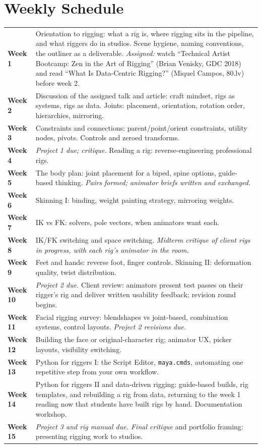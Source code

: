 \documentclass[10pt,a4paper]{article}
\begin{document}
\section{Weekly Schedule}
\begin{tabularx}{\textwidth}{@{}p{1.6cm}X@{}}
\textbf{Week 1} & Orientation to rigging: what a rig is, where rigging sits in the pipeline, and what riggers do in studios. Scene hygiene, naming conventions, the outliner as a deliverable. \textit{Assigned:} watch ``Technical Artist Bootcamp: Zen in the Art of Rigging'' (Brian Venisky, GDC 2018) and read ``What Is Data-Centric Rigging?'' (Miquel Campos, 80.lv) before week 2. \\
\textbf{Week 2} & Discussion of the assigned talk and article: craft mindset, rigs as systems, rigs as data. Joints: placement, orientation, rotation order, hierarchies, mirroring. \\
\textbf{Week 3} & Constraints and connections: parent/point/orient constraints, utility nodes, pivots. Controls and zeroed transforms. \\
\textbf{Week 4} & \textit{Project 1 due; critique.} Reading a rig: reverse-engineering professional rigs. \\
\textbf{Week 5} & The body plan: joint placement for a biped, spine options, guide-based thinking. \textit{Pairs formed; animator briefs written and exchanged.} \\
\textbf{Week 6} & Skinning I: binding, weight painting strategy, mirroring weights. \\
\textbf{Week 7} & IK vs FK: solvers, pole vectors, when animators want each. \\
\textbf{Week 8} & IK/FK switching and space switching. \textit{Midterm critique of client rigs in progress, with each rig's animator in the room.} \\
\textbf{Week 9} & Feet and hands: reverse foot, finger controls. Skinning II: deformation quality, twist distribution. \\
\textbf{Week 10} & \textit{Project 2 due.} Client review: animators present test passes on their rigger's rig and deliver written usability feedback; revision round begins. \\
\textbf{Week 11} & Facial rigging survey: blendshapes vs joint-based, combination systems, control layouts. \textit{Project 2 revisions due.} \\
\textbf{Week 12} & Building the face or original-character rig; animator UX, picker layouts, visibility switching. \\
\textbf{Week 13} & Python for riggers I: the Script Editor, \texttt{maya.cmds}, automating one repetitive step from your own workflow. \\
\textbf{Week 14} & Python for riggers II and data-driven rigging: guide-based builds, rig templates, and rebuilding a rig from data, returning to the week 1 reading now that students have built rigs by hand. Documentation workshop. \\
\textbf{Week 15} & \textit{Project 3 and rig manual due. Final critique} and portfolio framing: presenting rigging work to studios. \\
\end{tabularx}
\end{document}
